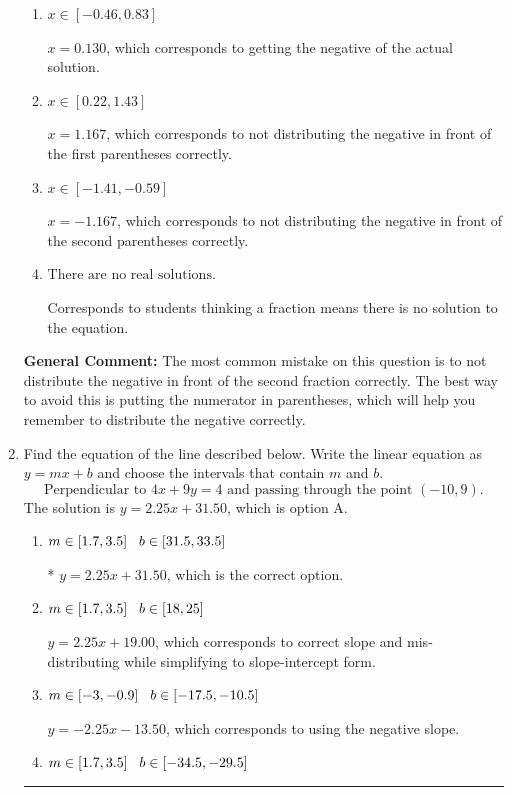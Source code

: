 \documentclass{extbook}[14pt]
\newcommand{\litem}[1]{\item #1

\rule{\textwidth}{0.4pt}}
\begin{document}
\begin{enumerate}
{\begin{enumerate}[label=\Alph*.]
* $x = -10.167$, which is the correct option.
\item \( x \in [-0.46, 0.83] \)

$x = 0.130$, which corresponds to getting the negative of the actual solution.
\item \( x \in [0.22, 1.43] \)

$x = 1.167$, which corresponds to not distributing the negative in front of the first parentheses correctly.
\item \( x \in [-1.41, -0.59] \)

$x = -1.167$, which corresponds to not distributing the negative in front of the second parentheses correctly.
\item \( \text{There are no real solutions.} \)

Corresponds to students thinking a fraction means there is no solution to the equation.
\end{enumerate}

\textbf{General Comment:} The most common mistake on this question is to not distribute the negative in front of the second fraction correctly. The best way to avoid this is putting the numerator in parentheses, which will help you remember to distribute the negative correctly.
}
\litem{
Find the equation of the line described below. Write the linear equation as $ y=mx+b $ and choose the intervals that contain $m$ and $b$.
\[ \text{Perpendicular to } 4 x + 9 y = 4 \text{ and passing through the point } (-10, 9). \]
The solution is \( y = 2.25x + 31.50 \), which is option A.\begin{enumerate}[label=\Alph*.]
\item \( m \in [1.7, 3.5] \hspace*{3mm} b \in [31.5, 33.5] \)

* $y = 2.25x + 31.50$, which is the correct option.
\item \( m \in [1.7, 3.5] \hspace*{3mm} b \in [18, 25] \)

 $y = 2.25x + 19.00$, which corresponds to correct slope and mis-distributing while simplifying to slope-intercept form.
\item \( m \in [-3, -0.9] \hspace*{3mm} b \in [-17.5, -10.5] \)

 $y = -2.25x - 13.50$, which corresponds to using the negative slope.
\item \( m \in [1.7, 3.5] \hspace*{3mm} b \in [-34.5, -29.5] \)


\end{enumerate}}
\end{enumerate}
\end{document}
